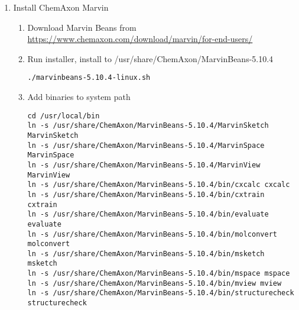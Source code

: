\documentclass[twoside]{book}
\begin{document}
\begin{enumerate}
\item Install ChemAxon Marvin
	\begin{enumerate}
	\item Download Marvin Beans from \url{https://www.chemaxon.com/download/marvin/for-end-users/}
	\item Run installer, install to /usr/share/ChemAxon/MarvinBeans-5.10.4
\begin{verbatim}
./marvinbeans-5.10.4-linux.sh
\end{verbatim}
	\item Add binaries to system path
\begin{verbatim}
cd /usr/local/bin
ln -s /usr/share/ChemAxon/MarvinBeans-5.10.4/MarvinSketch MarvinSketch
ln -s /usr/share/ChemAxon/MarvinBeans-5.10.4/MarvinSpace MarvinSpace
ln -s /usr/share/ChemAxon/MarvinBeans-5.10.4/MarvinView MarvinView
ln -s /usr/share/ChemAxon/MarvinBeans-5.10.4/bin/cxcalc cxcalc
ln -s /usr/share/ChemAxon/MarvinBeans-5.10.4/bin/cxtrain cxtrain
ln -s /usr/share/ChemAxon/MarvinBeans-5.10.4/bin/evaluate evaluate
ln -s /usr/share/ChemAxon/MarvinBeans-5.10.4/bin/molconvert molconvert
ln -s /usr/share/ChemAxon/MarvinBeans-5.10.4/bin/msketch msketch
ln -s /usr/share/ChemAxon/MarvinBeans-5.10.4/bin/mspace mspace
ln -s /usr/share/ChemAxon/MarvinBeans-5.10.4/bin/mview mview
ln -s /usr/share/ChemAxon/MarvinBeans-5.10.4/bin/structurecheck structurecheck
\end{verbatim}
	\end{enumerate}
	
\end{enumerate}
		
\end{document}
